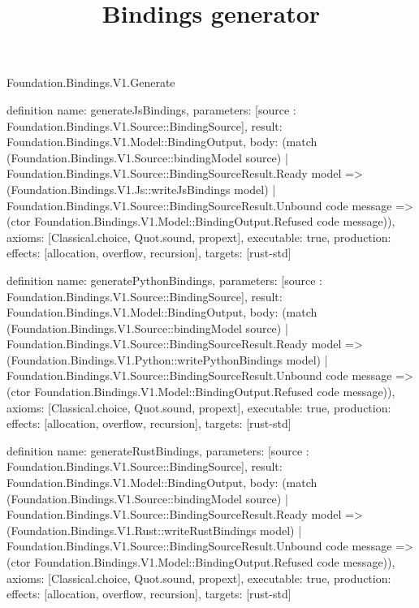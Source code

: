 \begin{lexlean}{Foundation.Bindings.V1.Generate}
\title{Bindings generator}
\begin{semanticmodule}
definition{
  name: generateJsBindings,
  parameters: [source : Foundation.Bindings.V1.Source::BindingSource],
  result: Foundation.Bindings.V1.Model::BindingOutput,
  body: (match (Foundation.Bindings.V1.Source::bindingModel source)
    | Foundation.Bindings.V1.Source::BindingSourceResult.Ready model => (Foundation.Bindings.V1.Js::writeJsBindings model)
    | Foundation.Bindings.V1.Source::BindingSourceResult.Unbound code message => (ctor Foundation.Bindings.V1.Model::BindingOutput.Refused code message)),
  axioms: [Classical.choice, Quot.sound, propext],
  executable: true,
  production: {effects: [allocation, overflow, recursion], targets: [rust-std]}
}

definition{
  name: generatePythonBindings,
  parameters: [source : Foundation.Bindings.V1.Source::BindingSource],
  result: Foundation.Bindings.V1.Model::BindingOutput,
  body: (match (Foundation.Bindings.V1.Source::bindingModel source)
    | Foundation.Bindings.V1.Source::BindingSourceResult.Ready model => (Foundation.Bindings.V1.Python::writePythonBindings model)
    | Foundation.Bindings.V1.Source::BindingSourceResult.Unbound code message => (ctor Foundation.Bindings.V1.Model::BindingOutput.Refused code message)),
  axioms: [Classical.choice, Quot.sound, propext],
  executable: true,
  production: {effects: [allocation, overflow, recursion], targets: [rust-std]}
}

definition{
  name: generateRustBindings,
  parameters: [source : Foundation.Bindings.V1.Source::BindingSource],
  result: Foundation.Bindings.V1.Model::BindingOutput,
  body: (match (Foundation.Bindings.V1.Source::bindingModel source)
    | Foundation.Bindings.V1.Source::BindingSourceResult.Ready model => (Foundation.Bindings.V1.Rust::writeRustBindings model)
    | Foundation.Bindings.V1.Source::BindingSourceResult.Unbound code message => (ctor Foundation.Bindings.V1.Model::BindingOutput.Refused code message)),
  axioms: [Classical.choice, Quot.sound, propext],
  executable: true,
  production: {effects: [allocation, overflow, recursion], targets: [rust-std]}
}
\end{semanticmodule}
\end{lexlean}
